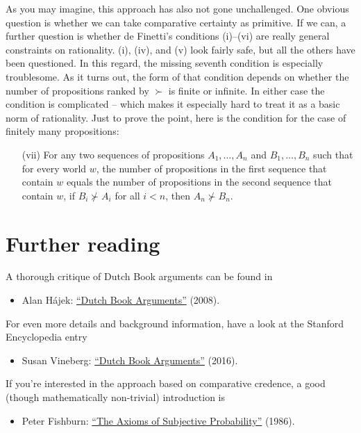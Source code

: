 As you may imagine, this approach has also not gone unchallenged. One
obvious question is whether we can take comparative certainty as
primitive. If we can, a further question is whether de Finetti's
conditions (i)--(vi) are really general constraints on
rationality. (i), (iv), and (v) look fairly safe, but all the others
have been questioned. In this regard, the missing seventh condition is
especially troublesome. As it turns out, the form of that condition
depends on whether the number of propositions ranked by $\succ$ is
finite or infinite. In either case the condition is complicated --
which makes it especially hard to treat it as a basic norm of
rationality. Just to prove the point, here is the condition for the
case of finitely many propositions:

\begin{itemize}
\item[(vii)] For any two sequences of propositions $A_1,\ldots,A_n$
  and $B_1,\ldots,B_n$ such that for every world $w$, the number of
  propositions in the first sequence that contain $w$ equals the
  number of propositions in the second sequence that contain $w$, if
  $B_i \not\succ A_i$ for all $i < n$, then $A_n \not\succ B_n$.
\end{itemize}



\section{Further reading}

A thorough critique of Dutch Book arguments can be found in
%
\begin{itemize}
\item Alan H\'ajek: \href{http://philrsss.anu.edu.au/people-defaults/alanh/papers/DBA.pdf}{``Dutch Book Arguments''} (2008).
\end{itemize}
%
For even more details and background information, have a look at the
Stanford Encyclopedia entry
%
\begin{itemize}
\item Susan Vineberg: \href{https://plato.stanford.edu/entries/dutch-book/}{``Dutch Book Arguments''} (2016).
\end{itemize}

If you're interested in the approach based on comparative credence,
a good (though mathematically non-trivial) introduction is
%
\begin{itemize}
\item Peter Fishburn: \href{https://projecteuclid.org/download/pdf_1/euclid.ss/1177013611}{``The Axioms of Subjective Probability''} (1986).
\end{itemize}

